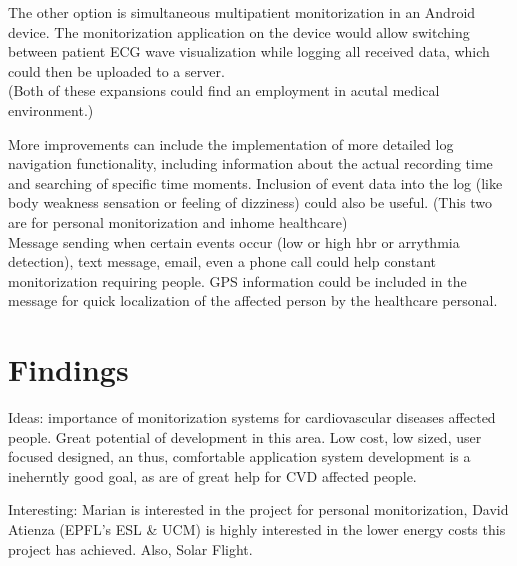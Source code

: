 		The other option is simultaneous multipatient monitorization in an Android device. The monitorization application on the device would allow switching between patient ECG wave visualization while logging all received data, which could then be uploaded to a server.\\

		(Both of these expansions could find an employment in acutal medical environment.)


		More improvements can include the implementation of more detailed log navigation functionality, including information about the actual recording time and searching of specific time moments.
		Inclusion of event data into the log (like body weakness sensation or feeling of dizziness) could also be useful.
		(This two are for personal monitorization and inhome healthcare)\\

		Message sending when certain events occur (low or high hbr or arrythmia detection), text message, email, even a phone call could help constant monitorization requiring people. GPS information could be included in the message for quick localization of the affected person by the healthcare personal.
	
	\section{Findings}
	\label{sec:end-findings}

		Ideas: importance of monitorization systems for cardiovascular diseases affected people. Great potential of development in this area. Low cost, low sized, user focused designed, an thus, comfortable application system development is a ineherntly good goal, as are of great help for CVD affected people.

		Interesting: Marian is interested in the project for personal monitorization, David Atienza (EPFL's ESL \& UCM) is highly interested in the lower energy costs this project has achieved. Also, Solar Flight.
